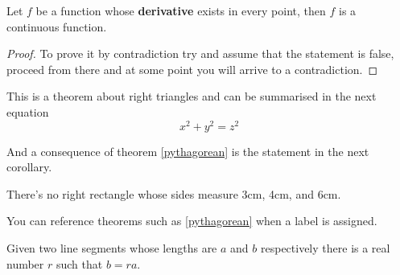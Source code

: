 \begin{thm}
    Let \(f\) be a function whose \textbf{derivative} exists in every point, then \(f\) is
    a continuous function.
\end{thm}
\begin{proof}
    To prove it by contradiction try and assume that the statement is false,
    proceed from there and at some point you will arrive to a contradiction.
\end{proof}

\begin{thm}
    \label{pythagorean}
    This is a theorem about right triangles and can be summarised in the next
    equation
    \[ x^2 + y^2 = z^2 \]
\end{thm}

And a consequence of theorem \ref{pythagorean} is the statement in the next
corollary.

\begin{cor}
    There's no right rectangle whose sides measure 3cm, 4cm, and 6cm.
\end{cor}

You can reference theorems such as \ref{pythagorean} when a label is assigned.

\begin{lem}
    Given two line segments whose lengths are \(a\) and \(b\) respectively there is a
    real number \(r\) such that \(b=ra\).
\end{lem}